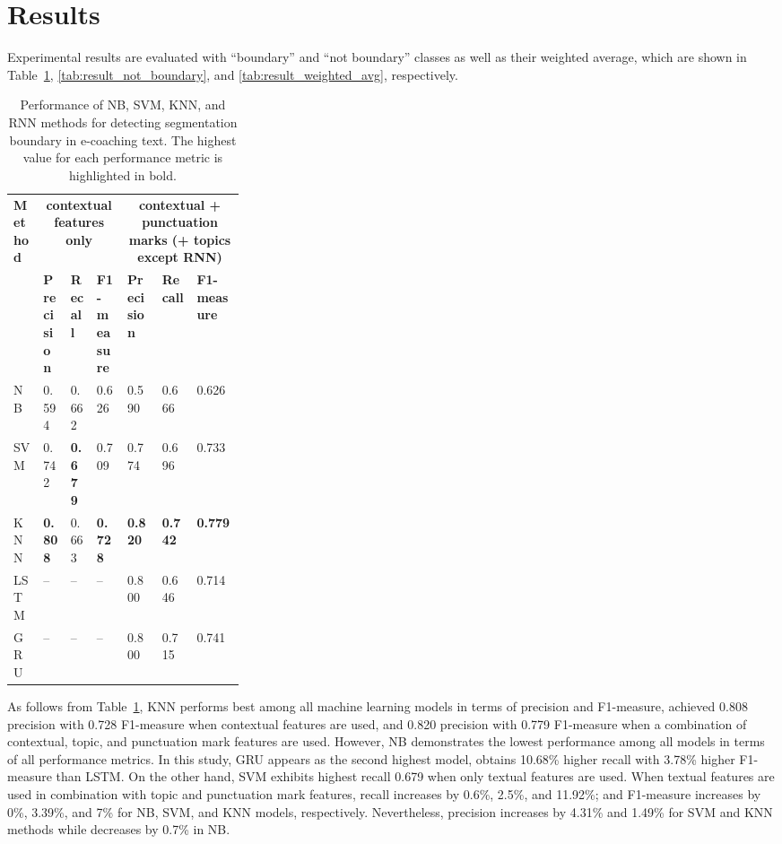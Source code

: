 \documentclass{amia}
\begin{document}
\section*{Results}
Experimental results are evaluated with ``boundary'' and ``not boundary'' classes as well as their weighted average, which are shown in Table~\ref{tab:result_boundary}, \ref{tab:result_not_boundary}, and \ref{tab:result_weighted_avg}, respectively.\\

\begin{table}[ht]
\centering
\caption{Performance of NB, SVM, KNN, and RNN methods for detecting segmentation boundary in e-coaching text. The highest value for each performance metric is highlighted in bold.}
\label{tab:result_boundary}
  \begin{tabular}{|l|l|l|l|p{0.15\linewidth}|p{0.15\linewidth}|l|}
  \hline
   \multirow{2}{*}{\textbf{Method}} & \multicolumn{3}{|c|}{\textbf{contextual features only}} & \multicolumn{3}{|c|}{\textbf{contextual + punctuation marks (+ topics except RNN)}} \\\cline{2-7}
   & \textbf{Precision}  & \textbf{Recall} & \textbf{F1-measure} & \textbf{Precision}  & \textbf{Recall} & \textbf{F1-measure}\\ \hline    
    
 NB & 0.594 & 0.662 & 0.626 & 0.590 & 0.666 & 0.626 \\ \hline
 SVM & 0.742 & \textbf{0.679} & 0.709 & 0.774 & 0.696 & 0.733\\ \hline
 KNN & \textbf{0.808} & 0.663 & \textbf{0.728} & \textbf{0.820} & \textbf{0.742} & \textbf{0.779}\\ \hline
 LSTM & -- & -- & -- & 0.800 & 0.646 & 0.714  \\ \hline
 GRU & -- & -- & -- & 0.800 & 0.715 & 0.741 \\ \hline 
  \end{tabular}
\end{table}                 

As follows from Table~\ref{tab:result_boundary}, KNN performs best among all machine learning models in terms of precision and F1-measure, achieved 0.808 precision with 0.728 F1-measure when contextual features are used, and 0.820 precision with 0.779 F1-measure when a combination of contextual, topic, and punctuation mark features are used. However, NB demonstrates the lowest performance among all models in terms of all performance metrics. In this study, GRU appears as the second highest model, obtains 10.68\% higher recall with 3.78\%  higher F1-measure than LSTM. On the other hand, SVM exhibits highest recall 0.679 when only textual features are used. When textual features are used in combination with topic and punctuation mark features, recall increases by 0.6\%, 2.5\%, and 11.92\%; and F1-measure increases by 0\%, 3.39\%, and 7\% for NB, SVM, and KNN models, respectively. Nevertheless, precision increases by 4.31\% and 1.49\% for SVM and KNN methods while decreases by 0.7\% in NB. \\
\end{document}
